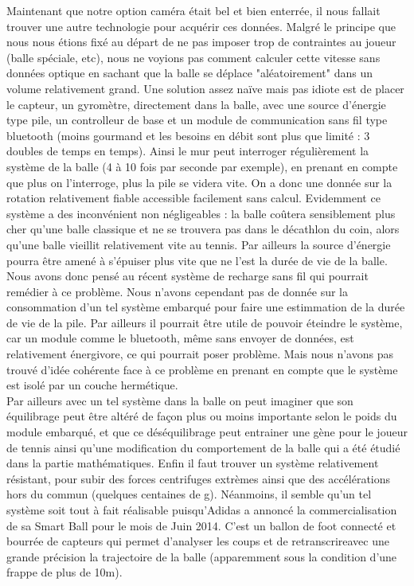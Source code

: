 Maintenant que notre option caméra était bel et bien enterrée, il nous fallait trouver une autre technologie pour acquérir ces données. Malgré le principe que nous nous étions fixé au départ de ne pas imposer trop de contraintes au joueur (balle spéciale, etc), nous ne voyions pas comment calculer cette vitesse sans données optique en sachant que la balle se déplace "aléatoirement" dans un volume relativement grand. Une solution assez naïve mais pas idiote est de placer le capteur, un gyromètre, directement dans la balle, avec une source d'énergie type pile, un controlleur de base et un module de communication sans fil type bluetooth (moins gourmand et les besoins en débit sont plus que limité : 3 doubles de temps en temps). Ainsi le mur peut interroger régulièrement la système de la balle (4 à 10 fois par seconde par exemple), en prenant en compte que plus on l'interroge, plus la pile se videra vite. On a donc une donnée sur la rotation relativement fiable accessible facilement sans calcul. Evidemment ce système a des inconvénient non négligeables : la balle coûtera sensiblement plus cher qu'une balle classique et ne se trouvera pas dans le décathlon du coin, alors qu'une balle vieillit relativement vite au tennis. Par ailleurs la source d'énergie pourra être amené à s'épuiser plus vite que ne l'est la durée de vie de la balle. Nous avons donc pensé au récent système de recharge sans fil qui pourrait remédier à ce problème. Nous n'avons cependant pas de donnée sur la consommation d'un tel système embarqué pour faire une estimmation de la durée de vie de la pile. Par ailleurs il pourrait être utile de pouvoir éteindre le système, car un module comme le bluetooth, même sans envoyer de données, est relativement énergivore, ce qui pourrait poser problème. Mais nous n'avons pas trouvé d'idée cohérente face à ce problème en prenant en compte que le système est isolé par un couche hermétique. \\

Par ailleurs avec un tel système dans la balle on peut imaginer que son équilibrage peut être altéré de façon plus ou moins importante selon le poids du module embarqué, et que ce déséquilibrage peut entrainer une gène pour le joueur de tennis ainsi qu'une modification du comportement de la balle qui a été étudié dans la partie mathématiques. Enfin il faut trouver un système relativement résistant, pour subir des forces centrifuges extrèmes ainsi que des accélérations hors du commun (quelques centaines de g). Néanmoins, il semble qu'un tel système soit tout à fait réalisable puisqu'Adidas a annoncé la commercialisation de sa Smart Ball pour le mois de Juin 2014. C'est un ballon de foot connecté et bourrée de capteurs qui permet d'analyser les coups et de retranscrireavec une grande précision la trajectoire de la balle (apparemment sous la condition d'une frappe de plus de 10m). 

